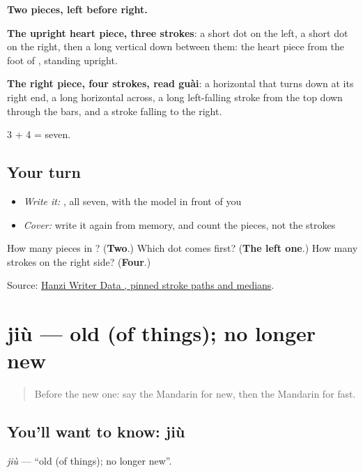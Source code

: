\begin{quote}
\end{quote}

\textbf{Two pieces, left before right.}

\textbf{The upright heart piece, three strokes}: a short dot on the left, a short dot on the right, then a long vertical down between them: the heart piece from the foot of , standing upright.

\textbf{The right piece, four strokes, read guài}: a horizontal that turns down at its right end, a long horizontal across, a long left-falling stroke from the top down through the bars, and a stroke falling to the right.

3 + 4 = seven.

\subsection*{Your turn}
\begin{itemize}
\raggedright
  \item \emph{Write it:} , all seven, with the model in front of you
  \item \emph{Cover:} write it again from memory, and count the pieces, not the strokes
\end{itemize}

\begin{tcolorbox}[breakable,colback=teal!4,colframe=teal!35!black,title={Before you move on}]
How many pieces in ? (\textbf{Two}.) Which dot comes first? (\textbf{The left one}.) How many strokes on the right side? (\textbf{Four}.)

Source: \href{https://raw.githubusercontent.com/chanind/hanzi-writer-data/68d10a4b21150cae5e1ebbd223eed289cf32d90c/data/\%E5\%BF\%AB.json}{Hanzi Writer Data , pinned stroke paths and medians}.
\end{tcolorbox}
\section[jiù]{jiù — old (of things); no longer new}

\label{lesson:ZH-C62-jiu}



\begin{quote}
Before the new one: say the Mandarin for new, then the Mandarin for fast.
\end{quote}

\subsection*{You'll want to know: jiù}
\emph{jiù} — \textquotedblleft{}old (of things); no longer new\textquotedblright{}.

